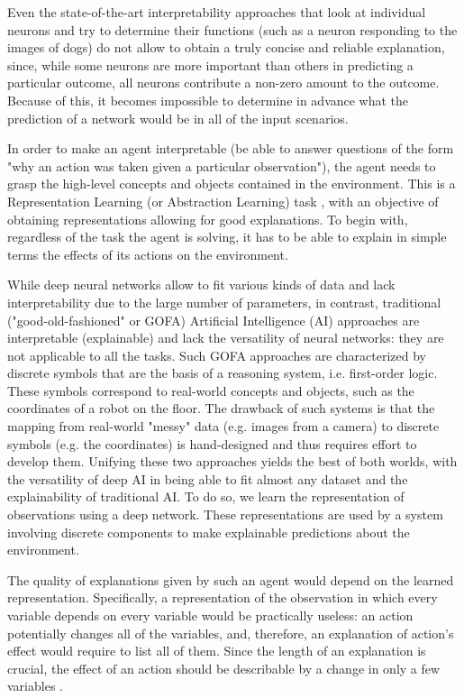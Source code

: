 \documentclass[a4paper,11pt,oneside]{report}
\begin{document}
Even the state-of-the-art interpretability approaches \cite{goh2021multimodal} that look at individual neurons and try to determine their functions (such as a neuron responding to the images of dogs) do not allow to obtain a truly concise and reliable explanation, since, while some neurons are more important than others in predicting a particular outcome, all neurons contribute a non-zero amount to the outcome. Because of this, it becomes impossible to determine in advance what the prediction of a network would be in all of the input scenarios.

In order to make an agent interpretable (be able to answer questions of the form "why an action was taken given a particular observation"), the agent needs to grasp the high-level concepts and objects contained in the environment. This is a Representation Learning (or Abstraction Learning) task \cite{Bengio2007,Learning2014,Deng,Mitchell2020,Scholkopf2021}, with an objective of obtaining representations allowing for good explanations. To begin with, regardless of the task the agent is solving, it has to be able to explain in simple terms the effects of its actions on the environment.

While deep neural networks allow to fit various kinds of data and lack interpretability due to the large number of parameters, in contrast, traditional ("good-old-fashioned" or GOFA) Artificial Intelligence (AI) approaches are interpretable (explainable) and lack the versatility of neural networks: they are not applicable to all the tasks.
Such GOFA approaches are characterized by discrete symbols that are the basis of a reasoning system, i.e. first-order logic.
These symbols correspond to real-world concepts and objects, such as the coordinates of a robot on the floor.
The drawback of such systems is that the mapping from real-world "messy" data (e.g. images from a camera) to discrete symbols (e.g. the coordinates) is hand-designed and thus requires effort to develop them.
Unifying these two approaches yields the best of both worlds, with the versatility of deep AI in being able to fit almost any dataset and the explainability of traditional AI.
To do so, we learn the representation of observations using a deep network. These representations are used by a system involving discrete components to make explainable predictions about the environment.

The quality of explanations given by such an agent would depend on the learned representation. Specifically, a representation of the observation in which every variable depends on every variable would be practically useless: an action potentially changes all of the variables, and, therefore, an explanation of action's effect would require to list all of them. Since the length of an explanation is crucial, the effect of an action should be describable by a change in only a few variables \cite{Schmidhuber2009,Chari2020,Gomez2006}.
\end{document}
